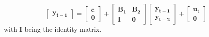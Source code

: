 \documentclass[a4paper,11pt,listof=nochaptergap,oneside,pointednumbers,bibtotoc,bigheadings,liststotoc]{scrbook}
\theoremstyle{mysatz}
\theoremstyle{mydefinition}
\theoremstyle{mybemerkung}
\newcommand{\vect}[1]{\boldsymbol{\mathbf{#1}}}
\begin{document}
\begin{enumerate}
{$$\begin{bmatrix}
				\vect{y_{t-1}}
 				\end{bmatrix} = \begin{bmatrix} 
								\vect{c}\\
								\vect{0}
 								\end{bmatrix} + 
									\begin{bmatrix} 
									\vect{B_1} & \vect{B_2}\\
									\vect{I} & \vect{0}
 									\end{bmatrix} \begin{bmatrix} \vect{y_{t-1}}\\
												\vect{y_{t-2}}
 												\end{bmatrix} + 
												\begin{bmatrix} \vect{u_{t}}\\
												\vect{0}
 												\end{bmatrix}$$ with $\vect{I}$ being the identity matrix.		
						}
						
						
						

\end{enumerate}
\end{document}
